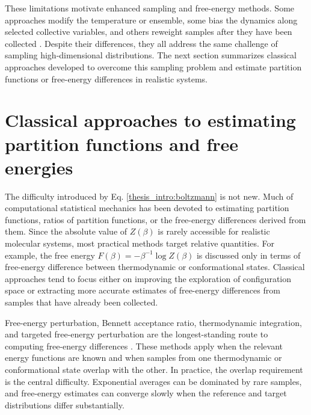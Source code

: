These limitations motivate enhanced sampling and free-energy methods. Some approaches modify the temperature or ensemble, some bias the dynamics along selected collective variables, and others reweight samples after they have been collected \citep{kirkpatrick1983optimization,SimulatedTempering,REMD,torrie1977nonphysical,metadynamics-review,abrams2014enhanced,wham,mbar,gallicchio2005temperature}. Despite their differences, they all address the same challenge of sampling high-dimensional distributions. The next section summarizes classical approaches developed to overcome this sampling problem and estimate partition functions or free-energy differences in realistic systems.


\section{Classical approaches to estimating partition functions and free energies}
\label{ch1:sec:classical-free-energy}

The difficulty introduced by Eq. \ref{thesis_intro:boltzmann} is not new. Much of computational statistical mechanics has been devoted to estimating partition functions, ratios of partition functions, or the free-energy differences derived from them. Since the absolute value of $Z(\beta)$ is rarely accessible for realistic molecular systems, most practical methods target relative quantities. For example, the free energy $F(\beta)=-\beta^{-1}\log Z(\beta)$ is discussed only in terms of free-energy difference between thermodynamic or conformational states. Classical approaches tend to focus either on improving the exploration of configuration space or extracting more accurate estimates of free-energy differences from samples that have already been collected.

Free-energy perturbation, Bennett acceptance ratio, thermodynamic integration, and targeted free-energy perturbation are the longest-standing route to computing free-energy differences \citep{zwanzig-fep,bar,TI,TFEP}. These methods apply when the relevant energy functions are known and when samples from one thermodynamic or conformational state overlap with the other. In practice, the overlap requirement is the central difficulty. Exponential averages can be dominated by rare samples, and free-energy estimates can converge slowly when the reference and target distributions differ substantially.

